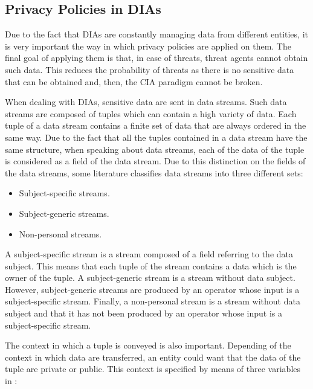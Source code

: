\subsection{Privacy Policies in DIAs}

Due to the fact that DIAs are constantly managing data from different entities, it is very important the way in which privacy policies are applied on them. The final goal of applying them is that, in case of threats, threat agents cannot obtain such data. This reduces the probability of threats as there is no sensitive data that can be obtained and, then, the CIA paradigm cannot be broken.

When dealing with DIAs, sensitive data are sent in data streams. Such data streams are composed of tuples which can contain a high variety of data. Each tuple of a data stream contains a finite set of data that are always ordered in the same way. Due to the fact that all the tuples contained in a data stream have the same structure, when speaking about data streams, each of the data of the tuple is considered as a field of the data stream. Due to this distinction on the fields of the data streams, some literature \cite{privacypoliciesarticle} classifies data streams into three different sets:

\begin{itemize}

\item Subject-specific streams.
\item Subject-generic streams.
\item Non-personal streams.

\end{itemize}

A subject-specific stream is a stream composed of a field referring to the data subject. This means that each tuple of the stream contains a data which is the owner of the tuple. A subject-generic stream is a stream without data subject. However, subject-generic streams are produced by an operator whose input is a subject-specific stream. Finally, a non-personal stream is a stream without data subject and that it has not been produced by an operator whose input is a subject-specific stream.

The context in which a tuple is conveyed is also important. Depending of the context in which data are transferred, an entity could want that the data of the tuple are private or public. This context is specified by means of three variables in \cite{privacypoliciesarticle}:

